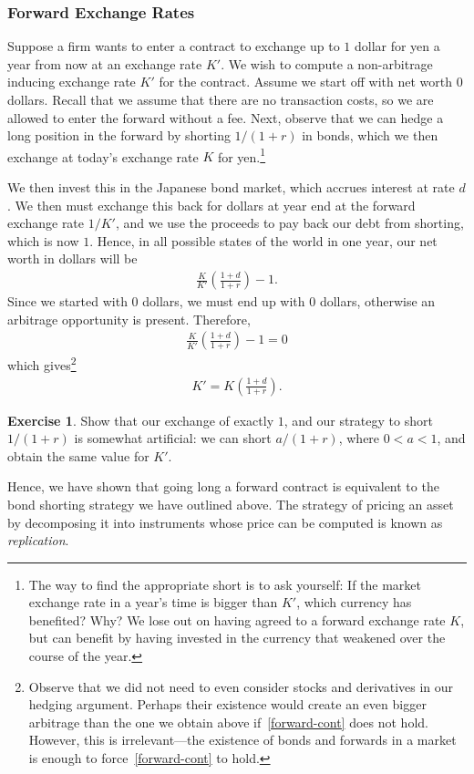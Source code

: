 \documentclass[12pt]{article}
\theoremstyle{plain}
\theoremstyle{definition}
\newtheorem*{exercise}{Exercise}
\theoremstyle{remark}
\numberwithin{equation}{section}  %
\begin{document}
\subsubsection{Forward Exchange Rates}
Suppose a firm wants to enter a contract to exchange up to $1$
dollar for yen a year from now at an exchange rate $K'$. We
wish to compute a non-arbitrage inducing exchange rate $K'$ for the
contract. 
Assume we start off with net worth $0$ dollars. Recall that we assume that 
there are no transaction costs, so we are allowed to enter the forward without 
a fee. 
Next, observe that we can hedge a long position in the forward by
shorting $1/(1+r)$ in bonds, which we then exchange at today's exchange rate
$K$ for yen.\footnote{The way to find the appropriate short is to ask yourself: 
	If
	the market exchange rate in a year's time is bigger than $K'$,
	which currency has benefited? Why?  We lose out on having agreed to
	a forward exchange rate $K$, but can benefit by having invested in
	the currency that weakened over the course of the year.
}

We then invest this in the Japanese bond market, which accrues interest at rate 
$d$. We then must exchange this back for dollars at year end at the forward 
exchange rate $1/K'$, and we use the proceeds to pay back our debt from 
shorting, which is now $1$. Hence, in all possible states of the world in one 
year, our net worth in dollars will be 
\begin{equation*}
	\begin{split}
		\frac{K}{K'} \left( \frac{1+d}{1+r} \right) -  1.
	\end{split}
\end{equation*}
Since we started with $0$ dollars, we must end up with $0$ dollars, otherwise 
an arbitrage opportunity is present. Therefore,
\begin{equation*}
	\begin{split}
		\frac{K}{K'} \left( \frac{1+d}{1+r} \right) -  1=0
	\end{split}
\end{equation*}
which gives\footnote{Observe that we did not need to even consider stocks
	and derivatives in our hedging argument. Perhaps their existence would
	create an even bigger arbitrage than the one we obtain above 
	if~\eqref{forward-cont} does not hold. However, this is irrelevant---the 
	existence of bonds and forwards in a market is enough to 
	force~\eqref{forward-cont} to hold.
}
\begin{equation}
	\label{forward-cont}
	\begin{split}
		K' = K\left( \frac{1+d}{1+r} \right). 
	\end{split}
\end{equation}
\begin{exercise}
	Show that our exchange of exactly $1$, and our strategy to short $1/(1+r)$ 
	is somewhat artificial: we can short $a/(1+r)$, where $0 < a < 1$, and 
	obtain the same
	value for $K'$.
\end{exercise}
Hence, we have shown that going long a forward contract is equivalent
to the bond shorting strategy we have outlined above. The strategy of pricing 
an asset by decomposing it into instruments whose price can be computed is 
known as \emph{replication}.
\end{document}
